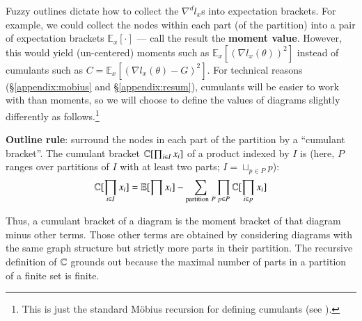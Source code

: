 \documentclass[anon,12pt]{colt2021} %
\newcommand{\wasq}[1]{\left[#1\right]}
\newcommand{\nb} { \nabla }
\newcommand{\lx} { l_x(\theta) }
\newcommand{\ex}[1] { \expc_x \wasq{#1} }
\newcommand{\expc}{\mathbb{E}}
\begin{document}
{            Fuzzy outlines dictate how to collect the $\nabla^d l_x$s into
            expectation brackets.  For example, we could collect the nodes
            within each part (of the partition) into a pair of expectation
            brackets $\expc_x\wasq{\cdot}$ --- call the result the
            \textbf{moment value}.
            However, this would yield (un-centered)
            moments such as $\ex{(\nb\lx)^2}$ instead of cumulants such as
            $C=\ex{(\nb\lx - G)^2}$.
            For technical reasons (\S\ref{appendix:mobius} and
            \S\ref{appendix:resum}), cumulants will be easier to work with than
            moments, so we will choose to define the values of diagrams
            slightly differently as follows.\footnote{
                This is just the standard M\"obius recursion for defining cumulants
                (see \cite{ro64}).
            }
            \par
                \textbf{Outline rule}: surround the nodes in each part of the
                partition by a ``cumulant bracket''.  The cumulant bracket
                $\mathbb{C}[\prod_{i\in I} x_i]$ of a product indexed by $I$ is (here,
                $P$ ranges over partitions of $I$ with at least two parts; $I =
                \sqcup_{p\in P} p$):
                $$
                    \CC[\prod_{i\in I} x_i] = \expc[\prod x_i] - \sum_{\text{partition}~P} \prod_{p\in P} \CC[\prod_{i\in p} x_i]
                $$
            \par
            Thus, a cumulant bracket of a diagram is the moment bracket of that
            diagram minus other terms.  Those other terms are obtained by considering
            diagrams with the same graph structure but strictly more parts in their
            partition.  The recursive definition
            of $\mathbb{C}$ grounds out because the maximal number of parts in a
            partition of a finite set is finite.

}
\end{document}
